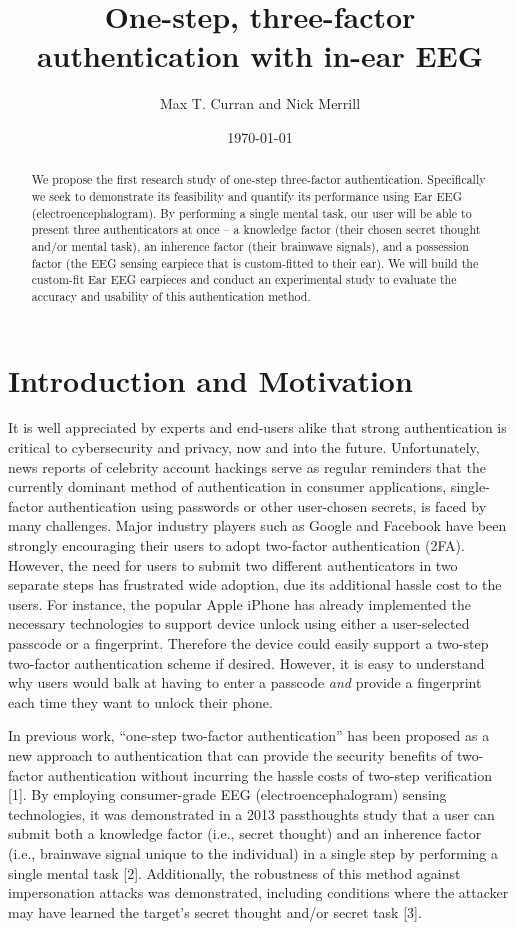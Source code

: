 \documentclass[11pt]{article}
\author{Max T. Curran and Nick Merrill}
\date{\today}
\title{One-step, three-factor authentication with in-ear EEG}
\begin{document}
\maketitle
\begin{abstract}
We propose the first research study of one-step three-factor authentication.
Specifically we seek to demonstrate its feasibility and quantify its performance
using Ear EEG (electroencephalogram). By performing a single mental task, our
user will be able to present three authenticators at once – a knowledge factor
(their chosen secret thought and/or mental task), an inherence factor (their
brainwave signals), and a possession factor (the EEG sensing earpiece that is
custom-fitted to their ear). We will build the custom-fit Ear EEG earpieces and
conduct an experimental study to evaluate the accuracy and usability of this
authentication method.
\end{abstract}
\section{Introduction and Motivation}
\label{sec:org5c92f27}

It is well appreciated by experts and end-users alike that strong authentication is
critical to cybersecurity and privacy, now and into the future. Unfortunately,
news reports of celebrity account hackings serve as regular reminders that
the currently dominant method of authentication in consumer applications, 
single-factor authentication using passwords or other user-chosen secrets, 
is faced by many challenges. Major industry players such as Google and
Facebook have been strongly encouraging their users to adopt two-factor
authentication (2FA). However, the need for users to submit two different 
authenticators in two separate steps has frustrated wide adoption, 
due its additional hassle cost to the users. For instance, the popular Apple
iPhone has already implemented the necessary technologies to support device
unlock using either a user-selected passcode or a fingerprint. Therefore the
device could easily support a two-step two-factor authentication scheme if
desired. However, it is easy to understand why users would balk at having to
enter a passcode \emph{and} provide a fingerprint each time they want to unlock their phone.

In previous work, “one-step two-factor authentication” has been proposed as a
new approach to authentication that can provide the security benefits of two-
factor authentication without incurring the hassle costs of two-step verification [1].
By employing consumer-grade EEG (electroencephalogram) sensing
technologies, it was demonstrated in a 2013 passthoughts study that a user can
submit both a knowledge factor (i.e., secret thought) and an inherence factor
(i.e., brainwave signal unique to the individual) in a single step by performing a
single mental task [2]. Additionally, the robustness of this method against
impersonation attacks was demonstrated, including conditions where the attacker
may have learned the target’s secret thought and/or secret task [3].
\end{document}
